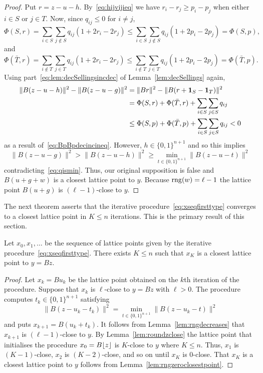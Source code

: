 \documentclass[final,leqno]{siamltex}
\begin{document}
\begin{proof}
Put $r = z - u - h$.  By~\eqref{eq:hijvijieq} we have $r_i - r_j \geq p_{i} - p_{j}$ when either $i \in S$ or $j \in T$.  Now, since $q_{ij} \leq 0$ for $i \neq j$,
\[
\Phi(S,r) = \sum_{i \in S}\sum_{j \notin S}q_{ij}(1 + 2r_i - 2r_j) \leq \sum_{i \in S}\sum_{j \notin S}q_{ij}(1 + 2p_i - 2p_j) = \Phi(S,p),
\]
and
\[
\Phi(\bar{T},r) = \sum_{i \notin T}\sum_{j \in T}q_{ij}(1 + 2r_i - 2r_j) \leq \sum_{i \notin T}\sum_{j \in T}q_{ij}(1 + 2p_i - 2p_j) = \Phi(\bar{T},p).
\]
Using part~\ref{eq:lem:decSellingsincdec} of Lemma~\ref{lem:decSellings} again,
\begin{align*}
\|B(z-u-h)\|^2 - \|B(z-u-g)\|^2 &= \|Br\|^2 - \|B(r+\boldsymbol{1}_S - \boldsymbol{1}_T)\|^2 \\
&= \Phi(S,r) + \Phi(\bar{T},r) + \sum_{i\in S}\sum_{j \in S} q_{ij} \\
&\leq \Phi(S,p) + \Phi(\bar{T}, p) + \sum_{i\in S}\sum_{j \in S} q_{ij} < 0 
\end{align*}
as a result of~\eqref{eq:BpBpdecincineq}.  However, $h \in \{0,1\}^{n+1}$ and so this implies
\[
\|B(z-u-g)\|^2 > \|B(z-u-h)\|^2 \geq \min_{t \in \{0,1\}^{n+1}}\|B(z - u - t)\|^2
\]
contradicting~\eqref{eq:qismin}.  Thus, our original supposition is false and $B(u+g+w)$ is a closest lattice point to $y$. Because $\operatorname{rng}(w) = \ell-1$ the lattice point $B(u+g)$ is $(\ell-1)$-close to $y$.
 \end{proof}

The next theorem asserts that the iterative procedure~\eqref{eq:xseqfirsttype} converges to a closest lattice point in $K \leq n$ iterations.  This is the primary result of this section.

\begin{theorem}
Let $x_0,x_1,\dots$ be the sequence of lattice points given by the iterative procedure~\eqref{eq:xseqfirsttype}.  There exists $K \leq n$ such that $x_K$ is a closest lattice point to $y = Bz$.
\end{theorem}
\begin{proof}
Let $x_k = B u_k$ be the lattice point obtained on the $k$th iteration of the procedure.  Suppose that $x_k$ is $\ell$-close to $y=Bz$ with $\ell > 0$.  The procedure computes $t_{k} \in \{0,1\}^{n+1}$ satisfying
\[
\|B(z - u_k - t_{k})\|^2 = \min_{t \in \{0,1\}^{n+1}}\|B(z - u_k - t)\|^2
\]
and puts $x_{k+1} = B(u_k + t_k)$.  It follows from Lemma~\ref{lem:rngdecreases} that $x_{k+1}$ is $(\ell-1)$-close to $y$.  By Lemma~\ref{lem:roundzclose} the lattice point that initialises the procedure $x_0 = B {\left\lfloor z \right\rfloor}$ is $K$-close to $y$ where $K \leq n$.  Thus, $x_1$ is $(K-1)$-close, $x_2$ is $(K-2)$-close, and so on until $x_K$ is $0$-close.  That $x_K$ is a closest lattice point to $y$ follows from Lemma~\ref{lem:rngzeroclosestpoint}.
\end{proof}
\end{document}
